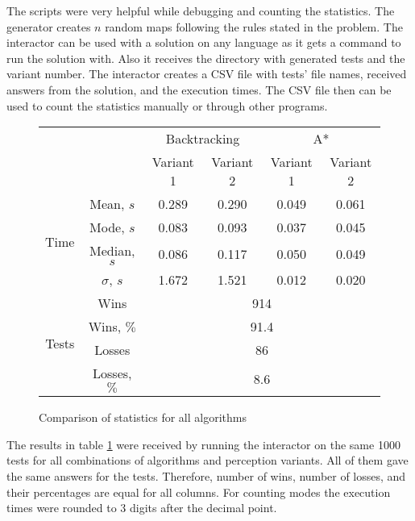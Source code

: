 \documentclass{article}
\begin{document}
The scripts were very helpful while debugging and counting the statistics.
The generator creates $n$ random maps following the rules stated in the problem.
The interactor can be used with a solution on any language as it gets a command to run the solution with. Also it receives the directory with generated tests and the variant number. The interactor creates a CSV file with tests' file names, received answers from the solution, and the execution times.
The CSV file then can be used to count the statistics manually or through other programs.

\begin{figure}[H]
    \centering
    \begin{tabular}{c|c|c|c|c|c}
        \multicolumn{2}{c}{} & \multicolumn{2}{|c}{Backtracking} & \multicolumn{2}{|c}{A*} \\
        \cline{3-6}
        \multicolumn{2}{c|}{} & Variant 1 & Variant 2 & Variant 1 & Variant 2 \\
        \hline
        \hline
        \multirow{4}{*}{Time} & Mean, $s$ & 0.289 & 0.290 & 0.049 & 0.061 \\
        \cline{2-6}
        & Mode, $s$ & 0.083 & 0.093 & 0.037 & 0.045 \\
        \cline{2-6}
        & Median, $s$ & 0.086 & 0.117 & 0.050 & 0.049 \\
        \cline{2-6}
        & $\sigma$, $s$ & 1.672 & 1.521 & 0.012 & 0.020 \\
        \hline
        \multirow{4}{*}{Tests} & Wins & \multicolumn{4}{c}{914} \\
        \cline{2-6}
        & Wins, $\%$ & \multicolumn{4}{c}{91.4} \\
        \cline{2-6}
        & Losses & \multicolumn{4}{c}{86} \\
        \cline{2-6}
        & Losses, $\%$ & \multicolumn{4}{c}{8.6} \\
    \end{tabular}
    \caption{Comparison of statistics for all algorithms}
    \label{fig:statistics}
\end{figure}

The results in table \ref{fig:statistics} were received by running the interactor on the same 1000 tests for all combinations of algorithms and perception variants.
All of them gave the same answers for the tests.
Therefore, number of wins, number of losses, and their percentages are equal for all columns.
For counting modes the execution times were rounded to 3 digits after the decimal point.
\end{document}

